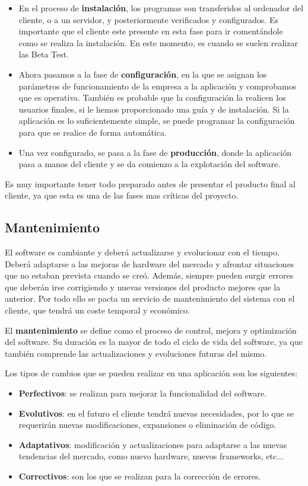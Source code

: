 \begin{itemize}
    \item En el proceso de \textbf{instalación}, los programas son transferidos al ordenador del cliente, o a un servidor, y posteriormente verificados y configurados. Es importante que el cliente este presente en esta fase para ir comentándole como se realiza la instalación. En este momento, es cuando se suelen realizar las Beta Test.

    \item Ahora pasamos a la fase de \textbf{configuración}, en la que se asignan los parámetros de funcionamiento de la empresa a la aplicación y comprobamos que es operativa. También es probable que la configuración la realicen los usuarios finales, si le hemos proporcionado una guía y de instalación. Si la aplicación es lo suficientemente simple, se puede programar la configuración para que se realice de forma automática.

    \item Una vez configurado, se pasa a la fase de \textbf{producción}, donde la aplicación pasa a manos del cliente y se da comienzo a la explotación del software.
\end{itemize}

Es muy importante tener todo preparado antes de presentar el producto final al cliente, ya que esta es una de las fases mas críticas del proyecto.

\subsection{Mantenimiento}
El software es cambiante y deberá actualizarse y evolucionar con el tiempo. Deberá adaptarse a las mejoras de hardware del mercado y afrontar situaciones que no estaban prevista cuando se creó. Además, siempre pueden surgir errores que deberán irse corrigiendo y nuevas versiones del producto mejores que la anterior. Por todo ello se pacta un servicio de mantenimiento del sistema con el cliente, que tendrá un coste temporal y económico.

El \textbf{mantenimiento} se define como el proceso de control, mejora y optimización del software. Su duración es la mayor de todo el ciclo de vida del software, ya que también comprende las actualizaciones y evoluciones futuras del mismo.

Los tipos de cambios que se pueden realizar en una aplicación son los siguientes:

\begin{itemize}
    \item \textbf{Perfectivos}: se realizan para mejorar la funcionalidad del software.
    \item \textbf{Evolutivos}: en el futuro el cliente tendrá nuevas necesidades, por lo que se requerirán nuevas modificaciones, expansiones o eliminación de código.
    \item \textbf{Adaptativos}: modificación y actualizaciones para adaptarse a las nuevas tendencias del mercado, como nuevo hardware, nuevos frameworks, etc...
    \item \textbf{Correctivos}: son los que se realizan para la corrección de errores.
\end{itemize}

